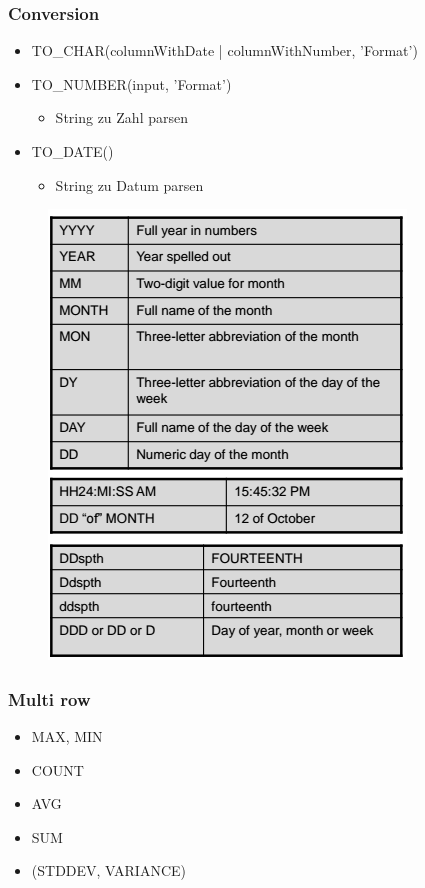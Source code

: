 \subsubsection{Conversion}
\begin{itemize}
    \item TO\_CHAR(columnWithDate | columnWithNumber, 'Format')
    \item TO\_NUMBER(input, 'Format')
    \begin{itemize}
        \item String zu Zahl parsen
    \end{itemize}
    \item TO\_DATE()
    \begin{itemize}
        \item String zu Datum parsen
    \end{itemize}
\end{itemize}
\begin{figure}[H]
    \centering 
    \includegraphics[]{res/themekorb_2/format.png}
\end{figure}
\subsubsection{Multi row}
\begin{itemize}
    \item MAX, MIN
    \item COUNT
    \item AVG
    \item SUM
    \item (STDDEV, VARIANCE)
\end{itemize}

